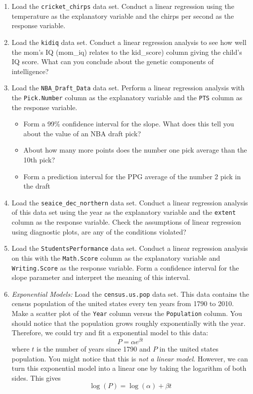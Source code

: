 \documentclass[
]{book}
\theoremstyle{definition}
\theoremstyle{definition}
\theoremstyle{definition}
\theoremstyle{definition}
\theoremstyle{remark}
\begin{document}
\begin{enumerate}
\def\labelenumi{\arabic{enumi}.}
\item
  Load the \texttt{cricket\_chirps} data set. Conduct a linear regression using the temperature as the explanatory variable and the chirps per second as the response variable.
\item
  Load the \texttt{kidiq} data set. Conduct a linear regression analysis to see how well the mom's IQ (mom\_iq) relates to the kid\_score) column giving the child's IQ score. What can you conclude about the genetic components of intelligence?
\item
  Load the \texttt{NBA\_Draft\_Data} data set. Perform a linear regression analysis with the \texttt{Pick.Number} column as the explanatory variable and the \texttt{PTS} column as the response variable.

  \begin{itemize}
  \item
    Form a 99\% confidence interval for the slope. What does this tell you about the value of an NBA draft pick?
  \item
    About how many more points does the number one pick average than the 10th pick?
  \item
    Form a prediction interval for the PPG average of the number 2 pick in the draft
  \end{itemize}
\item
  Load the \texttt{seaice\_dec\_northern} data set. Conduct a linear regression analysis of this data set using the year as the explanatory variable and the \texttt{extent} column as the response variable. Check the assumptions of linear regression using diagnostic plots, are any of the conditions violated?
\item
  Load the \texttt{StudentsPerformance} data set. Conduct a linear regression analysis on this with the \texttt{Math.Score} column as the explanatory variable and \texttt{Writing.Score} as the response variable. Form a confidence interval for the slope parameter and interpret the meaning of this interval.
\item
  \emph{Exponential Models:} Load the \texttt{census.us.pop} data set. This data contains the census population of the united states every ten years from 1790 to 2010. Make a scatter plot of the \texttt{Year} column versus the \texttt{Population} column. You should notice that the population grows roughly exponentially with the year. Therefore, we could try and fit a exponential model to this data: \[P=\alpha e^{\beta t}\] where \(t\) is the number of years since 1790 and \(P\) in the united states population. You might notice that this is \emph{not a linear model}. However, we can turn this exponential model into a linear one by taking the logarithm of both sides. This gives \[\log(P)=\log(\alpha)+\beta t\]
\end{enumerate}
\end{document}
